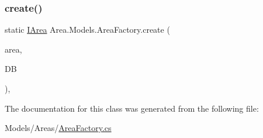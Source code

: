 \subsubsection{\texorpdfstring{create()}{create()}}
{\footnotesize\ttfamily static \mbox{\hyperlink{interfaceArea_1_1Models_1_1IArea}{I\+Area}} Area.\+Models.\+Area\+Factory.\+create (\begin{DoxyParamCaption}\item[{\mbox{\hyperlink{classArea_1_1Models_1_1AREA}{A\+R\+EA}}}]{area,  }\item[{\mbox{\hyperlink{classArea_1_1DAT_1_1AreaDbContext}{Area\+Db\+Context}}}]{DB }\end{DoxyParamCaption})\hspace{0.3cm}{\ttfamily [inline]}, {\ttfamily [static]}}



The documentation for this class was generated from the following file\+:\begin{DoxyCompactItemize}
\item 
Models/\+Areas/\mbox{\hyperlink{AreaFactory_8cs}{Area\+Factory.\+cs}}\end{DoxyCompactItemize}
